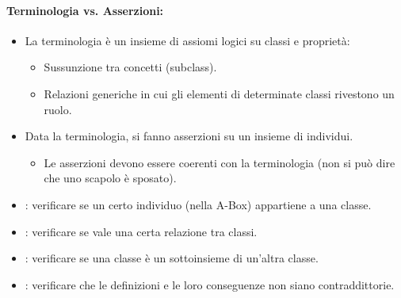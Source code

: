 
\paragraph{Terminologia vs. Asserzioni:}

\begin{itemize}
  \item La terminologia è un insieme di assiomi logici su classi
e proprietà: 
\begin{itemize}
  \item Sussunzione tra concetti (subclass). 
  \item Relazioni generiche in cui gli elementi di determinate classi
rivestono un ruolo.
\end{itemize}
\item Data la terminologia, si fanno asserzioni su un insieme
di individui. 
\begin{itemize}
  \item Le asserzioni devono essere coerenti con la terminologia (non
si può dire che uno scapolo è sposato). 
\end{itemize}
\end{itemize}


\begin{itemize}
\item {}: verificare se un
certo individuo (nella A-Box)
appartiene a una classe. 
\item {}: verificare se vale
una certa relazione tra classi.
\item {}: verificare se una classe
è un sottoinsieme di un'altra classe.
\item {}: verificare che le
definizioni e le loro conseguenze non
siano contraddittorie.
\end{itemize}













